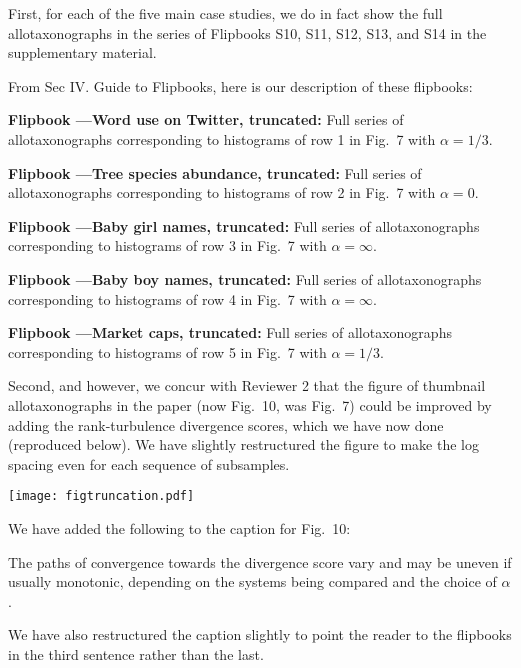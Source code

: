 First, for each of the five main case studies,
we do in fact show the full allotaxonographs in the series of
Flipbooks S10, S11, S12, S13, and S14 in the
supplementary material.

From Sec IV. Guide to Flipbooks,
here is our description of these flipbooks:
\begin{excerpt}
  \textbf{Flipbook \flipbooktwittertrunc---Word use on Twitter, truncated:}
  Full series of allotaxonographs 
  corresponding to histograms of
  row 1 in Fig.~7 with $\alpha=1/3$.

  \smallskip
  \textbf{Flipbook \flipbooktreestrunc---Tree species abundance, truncated:}
  Full series of allotaxonographs 
  corresponding to histograms of
  row 2 in Fig.~7 with $\alpha=0$.

  \smallskip
  \textbf{Flipbook \flipbookgirlnamestrunc---Baby girl names, truncated:}
  Full series of allotaxonographs 
  corresponding to histograms of
  row 3 in Fig.~7 with $\alpha=\infty$.

  \smallskip
  \textbf{Flipbook \flipbookboynamestrunc---Baby boy names, truncated:}
  Full series of allotaxonographs 
  corresponding to histograms of
  row 4 in Fig.~7 with $\alpha=\infty$.

  \smallskip
  \textbf{Flipbook \flipbookcompaniestrunc---Market caps, truncated:}
  Full series of allotaxonographs 
  corresponding to histograms of
  row 5 in Fig.~7 with $\alpha=1/3$.
\end{excerpt}

Second, and however, we concur with Reviewer 2 that the figure of thumbnail
allotaxonographs in the paper (now Fig.~10, was Fig.~7) could be improved by adding
the rank-turbulence divergence scores, which we have now done (reproduced below).
We have slightly restructured the figure to make the log spacing
even for each sequence of subsamples.

\texttt{[image: figtruncation.pdf]}

We have added the following to the caption for Fig.~10:
\begin{excerpt}
  The paths of convergence towards the divergence score
  vary and may be uneven if usually monotonic,
  depending on
  the systems being compared and the choice of $\alpha$.
\end{excerpt}

We have also restructured the caption slightly to point
the reader to the flipbooks in the third sentence rather than the last.

